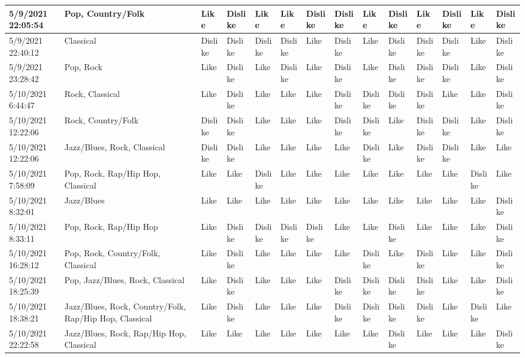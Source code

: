 \begin{table}
{\begin{tabular}{|l|l|l|l|l|l|l|l|l|l|l|l|l|l|}
        5/9/2021 22:05:54 & Pop, Country/Folk & Like & Dislike & Like & Like & Dislike & Dislike & Like & Dislike & Like & Dislike & Like & Dislike \\ \hline
        5/9/2021 22:40:12 & Classical & Dislike & Dislike & Dislike & Dislike & Like & Dislike & Like & Dislike & Dislike & Dislike & Like & Dislike \\ \hline
        5/9/2021 23:28:42 & Pop, Rock & Like & Dislike & Like & Dislike & Like & Dislike & Like & Dislike & Dislike & Dislike & Like & Dislike \\ \hline
        5/10/2021 6:44:47 & Rock, Classical & Like & Dislike & Like & Like & Like & Dislike & Dislike & Dislike & Dislike & Like & Like & Dislike \\ \hline
        5/10/2021 12:22:06 & Rock, Country/Folk & Dislike & Dislike & Like & Like & Like & Dislike & Dislike & Like & Dislike & Dislike & Like & Dislike \\ \hline
        5/10/2021 12:22:06 & Jazz/Blues, Rock, Classical & Dislike & Dislike & Like & Like & Like & Like & Dislike & Like & Dislike & Dislike & Like & Like \\ \hline
        5/10/2021 7:58:09 & Pop, Rock, Rap/Hip Hop, Classical & Like & Like & Dislike & Like & Like & Like & Like & Like & Like & Like & Dislike & Like \\ \hline
        5/10/2021 8:32:01 & Jazz/Blues & Like & Like & Like & Like & Like & Like & Like & Like & Like & Like & Like & Dislike \\ \hline
        5/10/2021 8:33:11 & Pop, Rock, Rap/Hip Hop & Like & Dislike & Dislike & Dislike & Dislike & Like & Like & Dislike & Like & Like & Like & Dislike \\ \hline
        5/10/2021 16:28:12 & Pop, Rock, Country/Folk, Classical & Like & Dislike & Like & Like & Like & Like & Dislike & Like & Dislike & Like & Like & Dislike \\ \hline
        5/10/2021 18:25:39 & Pop, Jazz/Blues, Rock, Classical & Like & Dislike & Like & Like & Like & Dislike & Dislike & Dislike & Dislike & Like & Like & Dislike \\ \hline
        5/10/2021 18:38:21 & Jazz/Blues, Rock, Country/Folk, Rap/Hip Hop, Classical & Like & Dislike & Like & Like & Like & Dislike & Dislike & Dislike & Dislike & Like & Dislike & Like \\ \hline
        5/10/2021 22:22:58 & Jazz/Blues, Rock, Rap/Hip Hop, Classical & Like & Like & Like & Like & Like & Like & Like & Dislike & Like & Like & Like & Dislike \\ \hline

\end{tabular}}
\end{table}
